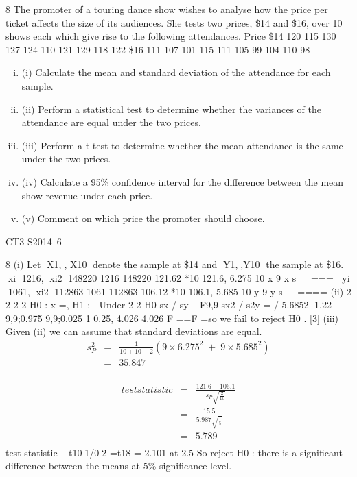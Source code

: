\documentclass[a4paper,12pt]{article}
\begin{document}
\begin{enumerate}

8 The promoter of a touring dance show wishes to analyse how the price per ticket
affects the size of its audiences. She tests two prices, \$14 and \$16, over 10 shows
each which give rise to the following attendances.
Price
\$14 120 115 130 127 124 110 121 129 118 122
\$16 111 107 101 115 111 105 99 104 110 98

\begin{enumerate}[(i)]
\item (i) Calculate the mean and standard deviation of the attendance for each sample.
\item 
(ii) Perform a statistical test to determine whether the variances of the attendance
are equal under the two prices. 
\item (iii) Perform a t-test to determine whether the mean attendance is the same under
the two prices. 
\item (iv) Calculate a 95\% confidence interval for the difference between the mean show
revenue under each price. 
\item (v) Comment on which price the promoter should choose.
\end{enumerate}

CT3 S2014–6

\newpage


8 (i) Let X1,, X10 denote the sample at \$14 and Y1,,Y10 the sample at \$16.
xi 1216, xi2 148220
1216 148220 121.62 *10 121.6, 6.275
10 x 9 x s 
 \;=\;\;=\;\;=\;
yi 1061, xi2 112863
1061 112863 106.12 *10 106.1, 5.685
10 y 9 y s 
 \;=\;\;=\;\;=\;\;=\;
(ii) 2 2 2 2
H0 : \sigma x \;=\;\sigmay  , H1 : \sigmax  \sigmay
Under 2 2
H0 sx / sy ~ F9,9
sx2 / s2y \;= / 5.6852 1.22
9,9;0.975 9,9;0.025
1 0.25, 4.026
4.026
F \;=\;\;=\;F \;=\;so we fail to reject H0 . [3]
(iii) Given (ii) we can assume that standard deviations are equal.
\begin{eqnarray*}
s_P^2 &=&  \frac{1}{10+ 10 - 2} \left(  9\times 6.275^2 \;+\; 9\times 5.685^2  \right)\\
&=& 35.847\\
\end{eqnarray*}


\begin{eqnarray*}
test statistic &=&  \frac{121.6 - 106.1} { s_P \sqrt{\frac{2}{10}}}\\
&=&  \frac{15.5} { 5.987 \sqrt{\frac{1}{5}}}\\
&=&  5.789 \\
\end{eqnarray*}
test statistic ~ t101/02 \;=\;t18 = 2.101 at 2.5%
So reject H0 : there is a significant difference between the means at 5\% significance level. 


\end{enumerate}
\end{document}
